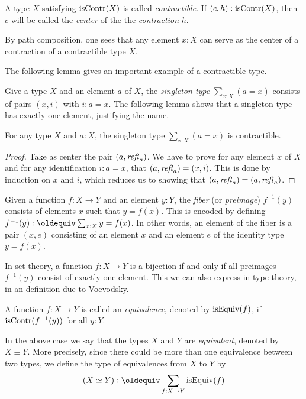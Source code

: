 A type $X$ satisfying $\mathrm{isContr}(X)$ is called \emph{contractible}.  If $ (c,h) : \mathrm{isContr}(X) $, then $c$ will be called the {\em center} of the
the {\em contraction} $h$.

By path composition, one sees that any element $x : X$ can serve as the center of a contraction of a contractible type $X$.

The following lemma gives an important example of a contractible type.

Give a type $X$ and an element $a$ of $X$, 
the \emph{singleton type} $\sum_{x:X} (a=x)$
consists of pairs $(x,i)$ with $i: a=x$. The following lemma shows that a singleton type has exactly one element, justifying the name.

\begin{lemma}\label{lem:thepathspaceiscontractible}
For any type $X$ and $a:X$, the singleton type $\sum_{x:X} (a=x)$ is contractible.
\end{lemma}

\begin{proof}
Take as center the pair $(a,\mathop{{\it refl}_{a}})$. We have
to prove for any element $x$ of $X$ and for any identification
$i: a=x$, that $(a,\mathop{{\it refl}_{a}}) = (x,i)$.  This is done by induction on $x$ and $i$, which reduces us to showing
that $(a,\mathop{{\it refl}_{a}}) = (a,\mathop{{\it refl}_{a}})$.
\end{proof}

\begin{definition}
\label{def:fiber}
Given a function $f : X \to Y$ and an element $y:Y$, 
the \emph{fiber} (or \emph{preimage}) $f^{-1}(y)$ consists 
of elements $x$ such that $y = f(x)$.  
This is encoded by defining $f^{-1}(y) \defeq \sum_{x:X} y = f(x)$.  
In other words, an element of the fiber is a pair $(x,e)$ consisting
of an element $x$ and an element $e$ of the identity type $y = f(x)$.
\end{definition}

In set theory, a function $f : X \to Y$ is a bijection if and only if
all preimages $f^{-1}(y)$ consist of exactly one element.
This we can also express in type theory, in an definition due
to Voevodsky. 

\begin{definition}
  \label{def:equivalence}
  A function $f : X \to Y$ is called an \emph{equivalence},
  denoted by $\mathrm{isEquiv}(f)$, if $\mathrm{isContr}(f^{-1}(y))$ for all $y:Y$.
\end{definition}

In the above case we say that the types
$X$ and $Y$ are \emph{equivalent}, denoted by $X\equiv Y$. 
More precisely, since there could be more than one equivalence
between two types, we define the type of equivalences from $X$ to $Y$ by
\[
(X\equiv Y) \defeq \sum_{f:X\to Y} \isEq(f) 
\]

